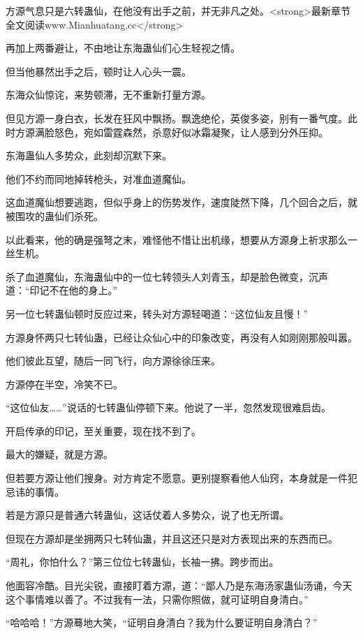 
\begin{this_body}

方源气息只是六转蛊仙，在他没有出手之前，并无非凡之处。<strong>最新章节全文阅读www.Mianhuatang.cc</strong>

再加上两番避让，不由地让东海蛊仙们心生轻视之情。

但当他暴然出手之后，顿时让人心头一震。

东海众仙惊诧，来势顿滞，无不重新打量方源。

但见方源一身白衣，长发在狂风中飘扬。飘逸绝伦，英俊多姿，别有一番气度。此时方源满脸怒色，宛如雷霆森然，杀意好似冰霜凝聚，让人感到分外压抑。

东海蛊仙人多势众，此刻却沉默下来。

他们不约而同地掉转枪头，对准血道魔仙。

这血道魔仙想要逃跑，但似乎身上的伤势发作，速度陡然下降，几个回合之后，就被围攻的蛊仙们杀死。

以此看来，他的确是强弩之末，难怪他不惜让出机缘，想要从方源身上祈求那么一丝生机。

杀了血道魔仙，东海蛊仙中的一位七转领头人刘青玉，却是脸色微变，沉声道：“印记不在他的身上。”

另一位七转蛊仙顿时反应过来，转头对方源轻喝道：“这位仙友且慢！”

方源身怀两只七转仙蛊，已经让众仙心中的印象改变，再没有人如刚刚那般叫嚣。

他们彼此互望，随后一同飞行，向方源徐徐压来。

方源停在半空，冷笑不已。

“这位仙友……”说话的七转蛊仙停顿下来。他说了一半，忽然发现很难启齿。

开启传承的印记，至关重要，现在找不到了。

最大的嫌疑，就是方源。

但若要方源让他们搜身。对方肯定不愿意。更别提察看他人仙窍，本身就是一件犯忌讳的事情。

若是方源只是普通六转蛊仙，这话仗着人多势众，说了也无所谓。

但现在方源却是坐拥两只七转仙蛊，并且这还只是对方表现出来的东西而已。

“周礼，你怕什么？”第三位位七转蛊仙，长袖一拂。跨步而出。

他面容冷酷。目光尖锐，直接盯着方源，道：“鄙人乃是东海汤家蛊仙汤诵，今天这个事情难以善了。不过我有一法，只需你照做，就可证明自身清白。”

“哈哈哈！”方源蓦地大笑，“证明自身清白？我为什么要证明自身清白？”


\end{this_body}
